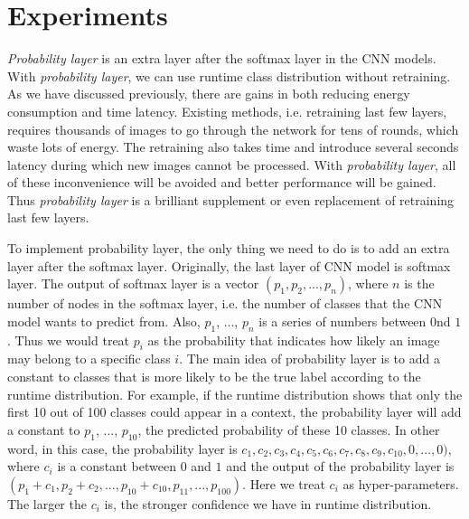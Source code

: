 \documentclass{article}
\begin{document}







\section{Experiments}
\textit{Probability layer} is an extra layer after the softmax layer in the CNN models. With \textit{probability layer}, we can use runtime class distribution without retraining. As we have discussed previously, there are gains in both reducing energy consumption and time latency. Existing methods, i.e. retraining last few layers, requires thousands of images to go through the network for tens of rounds, which waste lots of energy. The retraining also takes time and introduce several seconds latency during which new images cannot be processed. With \textit{probability layer}, all of these inconvenience will be avoided and better performance will be gained. Thus \textit{probability layer} is a brilliant supplement or even replacement of retraining last few layers.

To implement probability layer, the only thing we need to do is to add an extra layer after the softmax layer. Originally, the last layer of CNN model is softmax layer. The output of softmax layer is a vector $(p_1, p_2, ..., p_n)$, where $n$ is the number of nodes in the softmax layer, i.e. the number of classes that the CNN model wants to predict from. Also, $p_1$, ..., $p_n$ is a series of numbers between $0$nd $1$. Thus we would treat $p_i$ as the probability that indicates how likely an image may belong to a specific class $i$. The main idea of probability layer is to add a constant to classes that is more likely to be the true label according to the runtime distribution. For example, if the runtime distribution shows that only the first 10 out of 100 classes could appear in a context, the probability layer will add a constant to $p_1$, ..., $p_{10}$, the predicted probability of these 10 classes. In other word, in this case, the probability layer is $ c_1, c_2, c_3, c_4, c_5, c_6, c_7, c_8, c_9, c_{10}, 0, ...,0 )$, where $c_i$ is a constant between $0$ and $1$ and the output of the probability layer is $(p_1 + c_1, p_2 + c_2, ..., p_{10}+c_{10}, p_{11}, ..., p_{100})$. Here we treat $c_i$ as hyper-parameters. The larger the $c_i$ is, the stronger confidence we have in runtime distribution.
\end{document}
